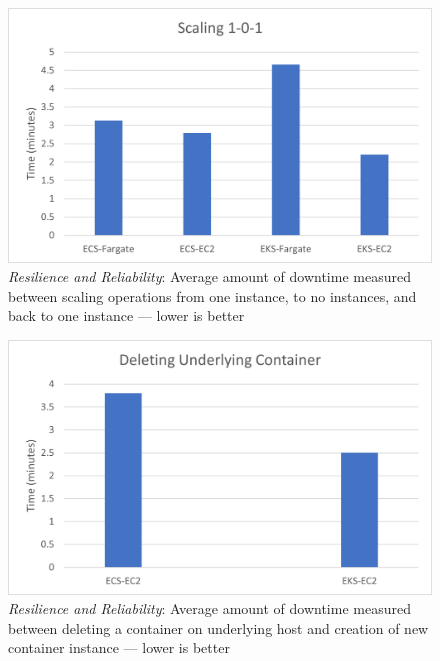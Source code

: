 \begin{figure}[hp]
  \includegraphics{images/rr-scaling.png}
  \caption{\emph{Resilience and Reliability}: Average amount of downtime measured between scaling operations from one instance, to no instances, and back to one instance --- lower is better}
  \label{fig:rr_scaling}
\end{figure}

\begin{figure}[hp]
  \includegraphics{images/rr-deleteContainer.png}
  \caption{\emph{Resilience and Reliability}: Average amount of downtime measured between deleting a container on underlying host and creation of new container instance --- lower is better}
  \label{fig:rr_deleteContainer}
\end{figure}

